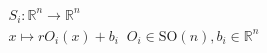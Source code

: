 \documentclass[preview]{standalone}
\begin{document}
\begin{align*}
S_i : \mathbb{R}^n \to \mathbb{R}^n \\ x \mapsto r O_i(x) + b_i \;\; O_i \in \text{SO}(n), b_i \in \mathbb{R}^n \\
\end{align*}
\end{document}
